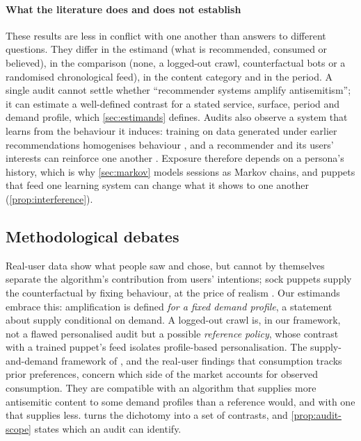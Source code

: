 \paragraph{What the literature does and does not establish}
These results are less in conflict with one another than answers to different questions. They differ in the estimand (what is recommended, consumed or believed), in the comparison (none, a logged-out crawl, counterfactual bots or a randomised chronological feed), in the content category and in the period. A single audit cannot settle whether ``recommender systems amplify antisemitism''; it can estimate a well-defined contrast for a stated service, surface, period and demand profile, which \cref{sec:estimands} defines. Audits also observe a system that learns from the behaviour it induces: training on data generated under earlier recommendations homogenises behaviour \citep{chaney2018}, and a recommender and its users' interests can reinforce one another \citep{jiang2019}. Exposure therefore depends on a persona's history, which is why \cref{sec:markov} models sessions as Markov chains, and puppets that feed one learning system can change what it shows to one another (\cref{prop:interference}).

\subsection{Methodological debates}\label{sec:bg-debates}

Real-user data show what people saw and chose, but cannot by themselves separate the algorithm's contribution from users' intentions; sock puppets supply the counterfactual by fixing behaviour, at the price of realism \citep{hosseinmardi2024}. Our estimands embrace this: amplification is defined \emph{for a fixed demand profile}, a statement about supply conditional on demand. A logged-out crawl \citep{ribeiro2020,ledwich2020} is, in our framework, not a flawed personalised audit but a possible \emph{reference policy}, whose contrast with a trained puppet's feed isolates profile-based personalisation. The supply-and-demand framework of \citet{munger2022}, and the real-user findings that consumption tracks prior preferences, concern which side of the market accounts for observed consumption. They are compatible with an algorithm that supplies more antisemitic content to some demand profiles than a reference would, and with one that supplies less.  turns the dichotomy into a set of contrasts, and \cref{prop:audit-scope} states which an audit can identify.

